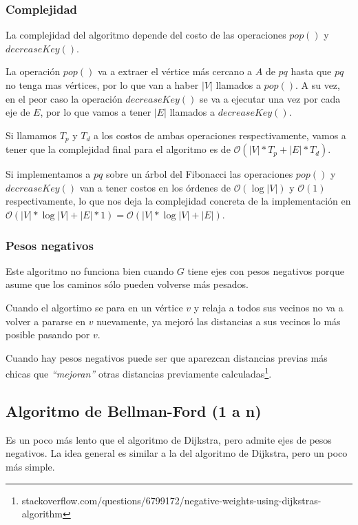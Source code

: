 \subsubsection*{Complejidad}

La complejidad del algoritmo depende del costo de las operaciones $pop()$ y $decreaseKey()$.

La operaci\'on $pop()$ va a extraer el v\'ertice m\'as cercano a $A$ de $pq$ hasta que $pq$ no tenga mas v\'ertices, por lo que van a haber $|V|$ llamados a $pop()$. A su vez, en el peor caso la operaci\'on $decreaseKey()$ se va a ejecutar una vez por cada eje de $E$, por lo que vamos a tener $|E|$ llamados a $decreaseKey()$.

Si llamamos $T_p$ y $T_d$ a los costos de ambas operaciones respectivamente, vamos a tener que la complejidad final para el algoritmo es de $\mathcal{O}(|V| * T_p + |E| * T_d)$.

Si implementamos a $pq$ sobre un \'arbol del Fibonacci las operaciones $pop()$ y $decreaseKey()$ van a tener costos en los \'ordenes de $\mathcal{O}(\log{} |V|)$ y $\mathcal{O}(1)$ respectivamente, lo que nos deja la complejidad concreta de la implementaci\'on en $\mathcal{O}(|V| * \log{} |V| + |E| * 1) = \mathcal{O}(|V| * \log{} |V| + |E|)$.

\subsubsection*{Pesos negativos}

Este algoritmo no funciona bien cuando $G$ tiene ejes con pesos negativos porque asume que los caminos s\'olo pueden volverse m\'as pesados.

Cuando el algortimo se para en un v\'ertice $v$ y relaja a todos sus vecinos no va a volver a pararse en $v$ nuevamente, ya mejor\'o las distancias a sus vecinos lo m\'as posible pasando por $v$.

Cuando hay pesos negativos puede ser que aparezcan distancias previas m\'as chicas que \emph{``mejoran''} otras distancias previamente calculadas\footnote{stackoverflow.com/questions/6799172/negative-weights-using-dijkstras-algorithm}.

\newpage
\subsection{Algoritmo de Bellman-Ford (1 a n)}

Es un poco m\'as lento que el algoritmo de Dijkstra, pero admite ejes de pesos negativos. La idea general es similar a la del algoritmo de Dijkstra, pero un poco m\'as simple. 

